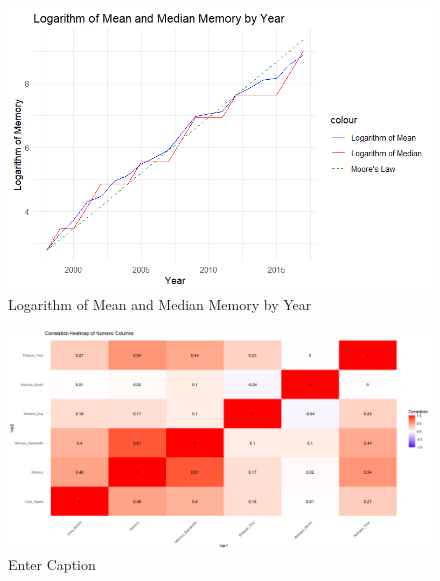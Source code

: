 \begin{figure}[ht]
  \centering
  \includegraphics[width=1\linewidth]{img/LogMeaMedMem_Year.png}
  \vspace{1pt}
  \caption{Logarithm of Mean and Median Memory by Year}
\end{figure}


\begin{figure}[ht]
  \centering
  \includegraphics[width=1\linewidth]{img/GPU_cor.png}
  \vspace{1pt}
  \caption{Enter Caption}
\end{figure}